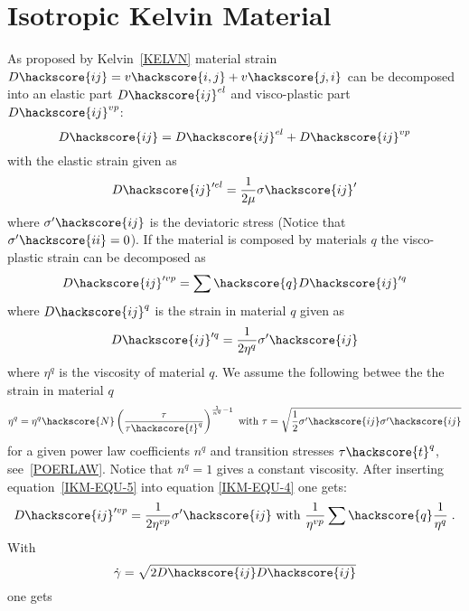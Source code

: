 \section{Isotropic Kelvin Material \label{IKM}}
As proposed by Kelvin~\ref{KELVN} material strain $D\hackscore{ij}=v\hackscore{i,j}+v\hackscore{j,i}$ can be decomposed into
an elastic part $D\hackscore{ij}^{el}$ and visco-plastic part $D\hackscore{ij}^{vp}$:
\begin{equation}\label{IKM-EQU-2}
D\hackscore{ij}=D\hackscore{ij}^{el}+D\hackscore{ij}^{vp}
\end{equation}
with the elastic strain given as 
\begin{equation}\label{IKM-EQU-3}
D\hackscore{ij}'^{el}=\frac{1}{2 \mu} \sigma\hackscore{ij}'
\end{equation}
where $\sigma'\hackscore{ij}$ is the deviatoric stress (Notice that $\sigma'\hackscore{ii}=0$).
If the material is composed by materials $q$ the visco-plastic strain can be decomposed as
\begin{equation}\label{IKM-EQU-4}
D\hackscore{ij}'^{vp}=\sum\hackscore{q} D\hackscore{ij}'^{q} 
\end{equation}
where $D\hackscore{ij}^{q}$ is the strain in material $q$ given as 
\begin{equation}\label{IKM-EQU-5}
D\hackscore{ij}'^{q}=\frac{1}{2 \eta^{q}} \sigma'\hackscore{ij} 
\end{equation}
where $\eta^{q}$ is the viscosity of material $q$. We assume the following 
betwee the the strain in material $q$ 
\begin{equation}\label{IKM-EQU-5b}
\eta^{q}=\eta^{q}\hackscore{N} \left(\frac{\tau}{\tau\hackscore{t}^q}\right)^{\frac{1}{n^{q}}-1}
\mbox{ with } \tau=\sqrt{\frac{1}{2}\sigma'\hackscore{ij} \sigma'\hackscore{ij}}
\end{equation}
for a given power law coefficients $n^{q}$ and transition stresses $\tau\hackscore{t}^q$, see~\ref{POERLAW}.
Notice that $n^{q}=1$ gives a constant viscosity.
After inserting equation~\ref{IKM-EQU-5} into equation \ref{IKM-EQU-4} one gets:
\begin{equation}\label{IKM-EQU-6}
D\hackscore{ij}'^{vp}=\frac{1}{2 \eta^{vp}} \sigma'\hackscore{ij} \mbox{ with } \frac{1}{\eta^{vp}} \sum\hackscore{q} \frac{1}{\eta^{q}} \;.
\end{equation}
With
\begin{equation}\label{IKM-EQU-8}
\dot{\gamma}=\sqrt{2 D\hackscore{ij} D\hackscore{ij}}
\end{equation}
one gets 

